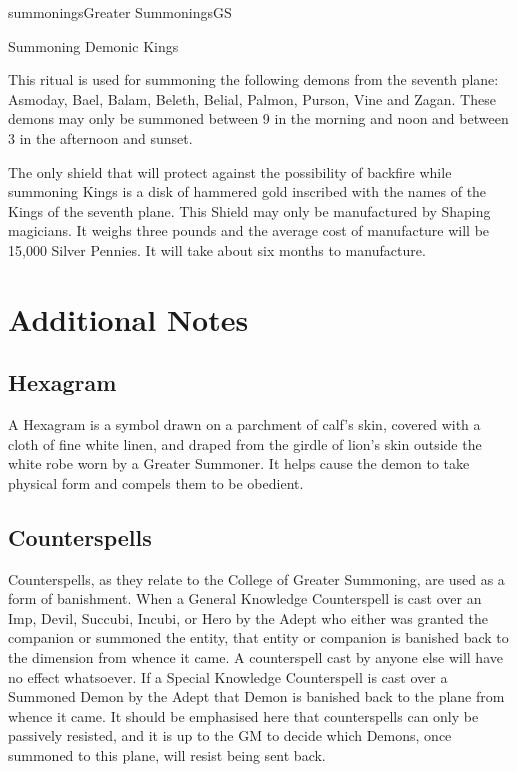 \begin{College}[1.0]{summonings}{Greater Summonings}{GS}
\begin{ritual}[R-6]{Summoning Demonic Kings }

\begin{effects}
This ritual is used for summoning the following demons from the
seventh plane: Asmoday, Bael, Balam, Beleth, Belial, Palmon, Purson,
Vine and Zagan. These demons may only be summoned between 9 in the
morning and noon and between 3 in the afternoon and sunset.

The only shield that will protect against the possibility of backfire
while summoning Kings is a disk of hammered gold inscribed with the
names of the Kings of the seventh plane.  This Shield may only be
manufactured by Shaping magicians.  It weighs three pounds and the
average cost of manufacture will be 15,000 Silver Pennies. It will
take about six months to manufacture.
\end{effects}
\end{ritual}


\section{Additional Notes}

\subsection{Hexagram}

A Hexagram is a symbol drawn on a parchment of calf’s skin, covered
with a cloth of fine white linen, and draped from the girdle of lion’s
skin outside the white robe worn by a Greater Summoner.  It helps
cause the demon to take physical form and compels them to be obedient.

\subsection{Counterspells}

Counterspells, as they relate to the College of Greater Summoning, are
used as a form of banishment. When a General Knowledge Counterspell is
cast over an Imp, Devil, Succubi, Incubi, or Hero by the Adept who
either was granted the companion or summoned the entity, that entity
or companion is banished back to the dimension from whence it came.  A
counterspell cast by anyone else will have no effect whatsoever. If a
Special Knowledge Counterspell is cast over a Summoned Demon by the
Adept that Demon is banished back to the plane from whence it came. It
should be emphasised here that counterspells can only be passively
resisted, and it is up to the GM to decide which Demons, once summoned
to this plane, will resist being sent back.


\end{College}

